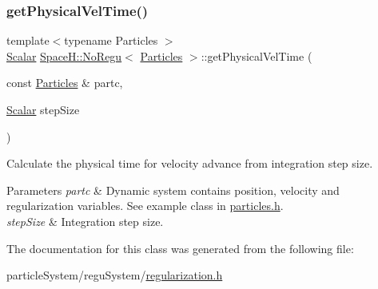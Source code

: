 \subsubsection{\texorpdfstring{get\+Physical\+Vel\+Time()}{getPhysicalVelTime()}}
{\footnotesize\ttfamily template$<$typename Particles $>$ \\
\mbox{\hyperlink{class_space_h_1_1_no_regu_a1b9ea47811c5f906727b791ba67ff458}{Scalar}} \mbox{\hyperlink{class_space_h_1_1_no_regu}{Space\+H\+::\+No\+Regu}}$<$ \mbox{\hyperlink{struct_space_h_1_1_particles}{Particles}} $>$\+::get\+Physical\+Vel\+Time (\begin{DoxyParamCaption}\item[{const \mbox{\hyperlink{struct_space_h_1_1_particles}{Particles}} \&}]{partc,  }\item[{\mbox{\hyperlink{class_space_h_1_1_no_regu_a1b9ea47811c5f906727b791ba67ff458}{Scalar}}}]{step\+Size }\end{DoxyParamCaption})\hspace{0.3cm}{\ttfamily [inline]}}



Calculate the physical time for velocity advance from integration step size. 


\begin{DoxyParams}{Parameters}
{\em partc} & Dynamic system contains position, velocity and regularization variables. See example class in \mbox{\hyperlink{particles_8h}{particles.\+h}}. \\
\hline
{\em step\+Size} & Integration step size. \\
\hline
\end{DoxyParams}


The documentation for this class was generated from the following file\+:\begin{DoxyCompactItemize}
\item 
particle\+System/regu\+System/\mbox{\hyperlink{regularization_8h}{regularization.\+h}}\end{DoxyCompactItemize}
